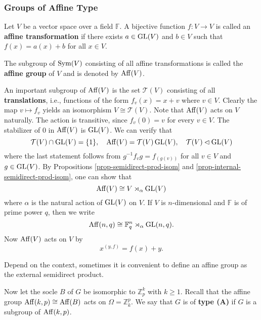 \subsubsection{Groups of Affine Type}  
	Let $V$ be a vector space over a field $\mathbb{F}$. A bijective function $f:V\to V$ is called an \textbf{affine transformation} if there exists $a\in\operatorname{GL}(V)$ and $b\in V$ such that $f(x) = a(x) + b$ for all $x\in V$. 
\begin{definition}
	The subgroup of $\operatorname{Sym}(V)$ consisting of all affine transformations is called the \textbf{affine group} of $V$ and is denoted by $\operatorname{Aff}(V)$. 
\end{definition}
An important subgroup of $\operatorname{Aff}(V)$ is the set $\mathcal{T}(V)$ consisting of all \textbf{translations}, i.e., functions of the form $f_v(x) = x+v$ where $v\in V$. Clearly the map $v\mapsto f_v$ yields an isomorphism $V\cong \mathcal{T}(V)$. Note that $\operatorname{Aff}(V)$ acts on $V$ naturally. The action is transitive, since $f_v(0) = v$ for every $v\in V$. The stabilizer of $0$ in $\operatorname{Aff}(V)$ is $\operatorname{GL}(V)$. We can verify that 
\begin{equation*}
	\mathcal{T}(V) \cap \operatorname{GL}(V)  = \{1\},\quad  \operatorname{Aff}(V) = \mathcal{T}(V)\operatorname{GL}(V), \quad \mathcal{T}(V)\lhd \operatorname{GL}(V)
\end{equation*}
where the last statement follows from $	g^{-1}f_vg = f_{(g(v))}$ for all $v\in V$ and $g\in \operatorname{GL}(V)$. By Propositions \ref{prop-semidirect-prod-isom} and \ref{prop-internal-semidirect-prod-isom}, one can show that
\begin{equation*}
\operatorname{Aff}(V) \cong V\rtimes_\alpha \operatorname{GL}(V)
\end{equation*}
where $\alpha$ is the natural action of $\operatorname{GL}(V)$ on $V$. If $V$ is $n$-dimensional and $\mathbb{F}$ is of prime power $q$, then we write 
\begin{equation*}
	\operatorname{Aff}(n,q) \cong \mathbb{F}^n_q\rtimes_\alpha \operatorname{GL}(n,q).
\end{equation*}
Now $\operatorname{Aff}(V)$ acts on $V$ by
\begin{equation*}
	x^{(y,f)} = f(x) + y.
\end{equation*}
\begin{remark}
	Depend on the context, sometimes it is convenient to define an affine group as the external semidirect product.
\end{remark}
Now let the socle $B$ of $G$ be isomorphic to $\mathbb{Z}_p^k$ with $k\geq 1$. Recall that the affine group $\operatorname{Aff}(k,p) \cong \operatorname{Aff}(B)$ acts on $\Omega = \mathbb{Z}_k^p$.  We say that $G$ is of \textbf{type (A)} if $G$ is a subgroup of $\operatorname{Aff}(k,p)$.



